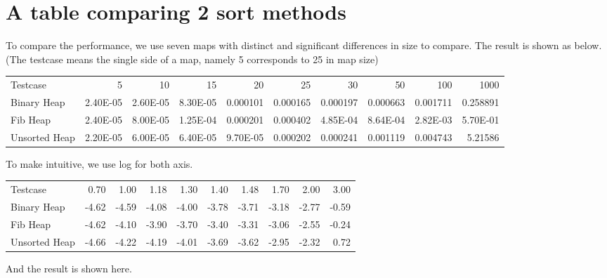 \documentclass{article}
\begin{document}
\section{A table comparing 2 sort methods}
\par To compare the performance, we use seven maps with distinct and significant differences in size to compare. The result is shown as below.(The testcase means the single side of a map, namely 5 corresponds to 25 in map size)
\begin{table}[htbp]
  \centering

    \begin{tabular}{lrrrrrrrrr}
    Testcase & 5     & 10    & 15    & 20    & 25    & 30    & 50    & 100   & 1000 \\
    Binary Heap & 2.40E-05 & 2.60E-05 & 8.30E-05 & 0.000101 & 0.000165 & 0.000197 & 0.000663 & 0.001711 & 0.258891 \\
    Fib Heap & 2.40E-05 & 8.00E-05 & 1.25E-04 & 0.000201 & 0.000402 & 4.85E-04 & 8.64E-04 & 2.82E-03 & 5.70E-01 \\
    Unsorted Heap & 2.20E-05 & 6.00E-05 & 6.40E-05 & 9.70E-05 & 0.000202 & 0.000241 & 0.001119 & 0.004743 & 5.21586 \\
    \end{tabular}%
\end{table}%

To make intuitive, we use log for both axis.
\begin{table}[htbp]
  \centering

    \begin{tabular}{lrrrrrrrrr}
    Testcase & 0.70  & 1.00  & 1.18  & 1.30  & 1.40  & 1.48  & 1.70  & 2.00  & 3.00  \\
    Binary Heap & -4.62  & -4.59  & -4.08  & -4.00  & -3.78  & -3.71  & -3.18  & -2.77  & -0.59  \\
    Fib Heap & -4.62  & -4.10  & -3.90  & -3.70  & -3.40  & -3.31  & -3.06  & -2.55  & -0.24  \\
    Unsorted Heap & -4.66  & -4.22  & -4.19  & -4.01  & -3.69  & -3.62  & -2.95  & -2.32  & 0.72  \\

    \end{tabular}%
\end{table}%
\newpage
And the result is shown here.
\end{document}
